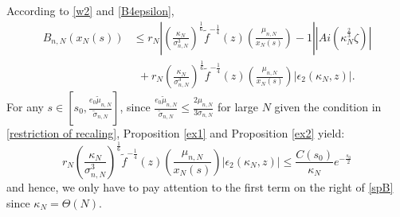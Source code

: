 \documentclass[11pt]{article}
\numberwithin{equation}{section}%
\numberwithin{theorem}{section}
\begin{document}
    According to \eqref{w2} and \eqref{B4epsilon}, 
    \begin{equation}\label{spB}
    \begin{split}
         B_{n,N}(x_N(s))&\le r_N\left|\left(\frac{\kappa_N}{\sigma_{n,N}^3}\right)^{\frac{1}{6}}\tilde{f}^{-\frac{1}{4}}(z)
\left(\frac{\mu_{n,N}}{x_N(s)}\right)-1\right|\left|Ai\left(\kappa_N^{\frac{2}{3}}\zeta\right)\right|\\&~~+r_N\left(\frac{\kappa_N}{\sigma_{n,N}^3}\right)^{\frac{1}{6}}\tilde{f}^{-\frac{1}{4}}(z)
\left(\frac{\mu_{n,N}}{x_N(s)}\right)|\epsilon_2(\kappa_N,z)|.
    \end{split}
    \end{equation}
For any $s\in\left[s_0,\frac{e_0\tilde\mu_{n,N}}{\tilde\sigma_{n,N}}\right]$, since $\frac{e_0\tilde\mu_{n,N}}{\tilde\sigma_{n,N}}\le\frac{2\mu_{n,N}}{3\sigma_{n,N}}$ for large $N$ given the condition in \eqref{restriction of recaling}, Proposition \ref{ex1} and Proposition \ref{ex2} yield:
\begin{equation*}
    r_N\left(\frac{\kappa_N}{\sigma^3_{n,N}}\right)^\frac{1}{6}\tilde{f}^{-\frac{1}{4}}(z)\left(\frac{\mu_{n,N}}{x_N(s)}\right)|\epsilon_2(\kappa_N,z)|\le\frac{C(s_0)}{\kappa_N}e^{-\frac{s_0}{2}}
\end{equation*}
and hence, we only have to pay attention to the first term on the right of \eqref{spB} since $\kappa_N=\Theta\left(N\right)$.
\end{document}
